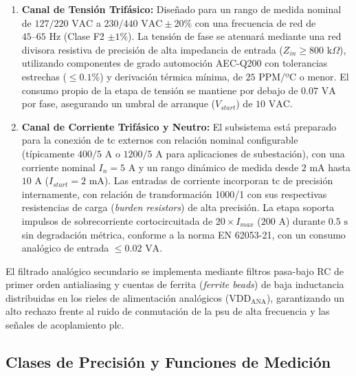 \begin{enumerate}
    \item \textbf{Canal de Tensión Trifásico:} Diseñado para un rango de medida nominal de $127/220\text{ VAC}$ a $230/440\text{ VAC} \pm 20\%$ con una frecuencia de red de $45\text{--}65\text{ Hz}$ (Clase F2 $\pm 1\%$). La tensión de fase se atenuará mediante una red divisora resistiva de precisión de alta impedancia de entrada ($Z_{in} \ge 800\text{ k}\Omega$), utilizando componentes de grado automoción AEC-Q200 con tolerancias estrechas ($\le 0.1\%$) y derivación térmica mínima, de $25 \text{ PPM/ºC}$ o menor. El consumo propio de la etapa de tensión se mantiene por debajo de $0.07\text{ VA}$ por fase, asegurando un umbral de arranque ($V_{start}$) de $10\text{ VAC}$.
    
    \item \textbf{Canal de Corriente Trifásico y Neutro:} El subsistema está preparado para la conexión de \gls{tc} externos con relación nominal configurable (típicamente $400/5\text{ A}$ o $1200/5\text{ A}$ para aplicaciones de subestación), con una corriente nominal $I_n = 5\text{ A}$ y un rango dinámico de medida desde $2\text{ mA}$ hasta $10\text{ A}$ ($I_{start} = 2\text{ mA}$). Las entradas de corriente incorporan \gls{tc} de precisión internamente, con relación de transformación 1000/1 con sus respectivas resistencias de carga (\textit{burden resistors}) de alta precisión. La etapa soporta impulsos de sobrecorriente cortocircuitada de $20 \times I_{max}$ ($200\text{ A}$) durante $0.5\text{ s}$ sin degradación métrica, conforme a la norma EN 62053-21, con un consumo analógico de entrada $\le 0.02\text{ VA}$.
\end{enumerate}

El filtrado analógico secundario se implementa mediante filtros pasa-bajo RC de primer orden antialiasing y cuentas de ferrita (\textit{ferrite beads}) de baja inductancia distribuidas en los rieles de alimentación analógicos ($\text{VDD}_{\text{ANA}}$), garantizando un alto rechazo frente al ruido de conmutación de la \gls{psu} de alta frecuencia y las señales de acoplamiento \gls{plc}.

\subsection{Clases de Precisión y Funciones de Medición}
\label{subsec:clases_precision_mediciones}

